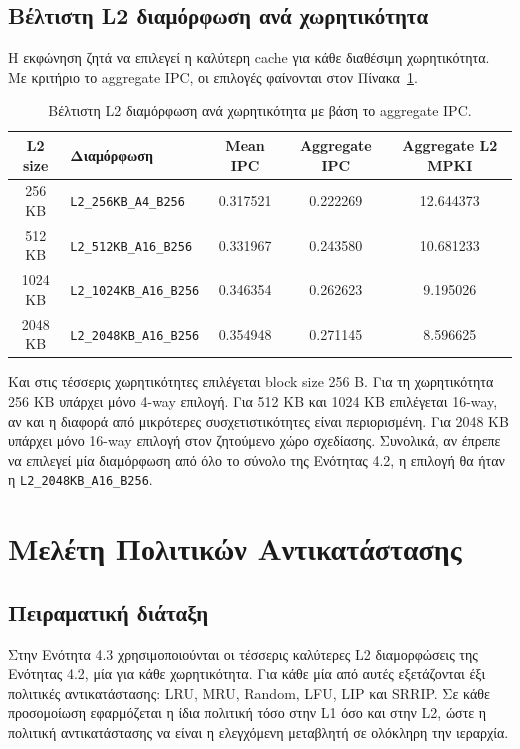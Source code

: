 \documentclass{article}
\begin{document}
\subsection{Βέλτιστη L2 διαμόρφωση ανά χωρητικότητα}

Η εκφώνηση ζητά να επιλεγεί η καλύτερη cache για κάθε διαθέσιμη χωρητικότητα. Με κριτήριο το aggregate IPC, οι επιλογές φαίνονται στον Πίνακα~\ref{tab:best-capacity}.

\begin{table}[htbp]
\centering
\caption{Βέλτιστη L2 διαμόρφωση ανά χωρητικότητα με βάση το aggregate IPC.}
\label{tab:best-capacity}
\begin{tabular}{c l c c c}
\toprule
\textbf{L2 size} & \textbf{Διαμόρφωση} & \textbf{Mean IPC} & \textbf{Aggregate IPC} & \textbf{Aggregate L2 MPKI} \\
\midrule
256 KB & \texttt{L2\_256KB\_A4\_B256} & 0.317521 & 0.222269 & 12.644373 \\
512 KB & \texttt{L2\_512KB\_A16\_B256} & 0.331967 & 0.243580 & 10.681233 \\
1024 KB & \texttt{L2\_1024KB\_A16\_B256} & 0.346354 & 0.262623 & 9.195026 \\
2048 KB & \texttt{L2\_2048KB\_A16\_B256} & 0.354948 & 0.271145 & 8.596625 \\
\bottomrule
\end{tabular}
\end{table}

Και στις τέσσερις χωρητικότητες επιλέγεται block size 256 B. Για τη χωρητικότητα 256 KB υπάρχει μόνο 4-way επιλογή. Για 512 KB και 1024 KB επιλέγεται 16-way, αν και η διαφορά από μικρότερες συσχετιστικότητες είναι περιορισμένη. Για 2048 KB υπάρχει μόνο 16-way επιλογή στον ζητούμενο χώρο σχεδίασης. Συνολικά, αν έπρεπε να επιλεγεί μία διαμόρφωση από όλο το σύνολο της Ενότητας 4.2, η επιλογή θα ήταν η \texttt{L2\_2048KB\_A16\_B256}.

\FloatBarrier

\section{Μελέτη Πολιτικών Αντικατάστασης}

\subsection{Πειραματική διάταξη}

Στην Ενότητα 4.3 χρησιμοποιούνται οι τέσσερις καλύτερες L2 διαμορφώσεις της Ενότητας 4.2, μία για κάθε χωρητικότητα. Για κάθε μία από αυτές εξετάζονται έξι πολιτικές αντικατάστασης: LRU, MRU, Random, LFU, LIP και SRRIP. Σε κάθε προσομοίωση εφαρμόζεται η ίδια πολιτική τόσο στην L1 όσο και στην L2, ώστε η πολιτική αντικατάστασης να είναι η ελεγχόμενη μεταβλητή σε ολόκληρη την ιεραρχία.
\end{document}
